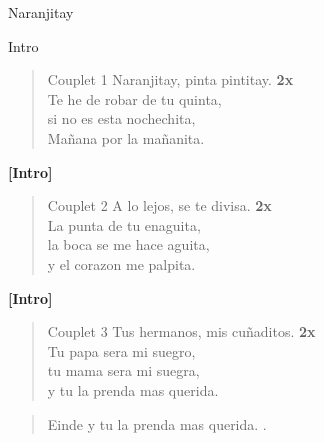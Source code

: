 \begin{song}{Naranjitay}

\begin{instrumental}{Intro}
\measure{}\measure{}\measure{}\measure{}\measure{}\measure{}
\measure{}\measure{}
\end{instrumental}


\begin{verse}{Couplet 1}
Naranjitay, pinta pintitay. \textbf{2x}\\
Te he de robar de tu quinta,\\
si no es esta nochechita,\\
Ma\~nana por la ma\~nanita.
\end{verse}

\textbf{[Intro]}\\

\begin{verse}{Couplet 2}
A lo lejos, se te divisa. \textbf{2x}\\
La punta de tu enaguita,\\
la boca se me hace aguita,\\
y el corazon me palpita.
\end{verse}

\textbf{[Intro]}\\


\begin{verse}{Couplet 3}
Tus hermanos, mis cu\~naditos. \textbf{2x}\\
Tu papa sera mi suegro,\\
tu mama sera mi suegra,\\
y tu la prenda mas querida.
\end{verse}

\begin{verse}{Einde}
y tu la prenda mas querida. \hspace{3em} \hspace{1em} \hspace{1em} \hspace{1em}.
\end{verse}
\end{song} 
